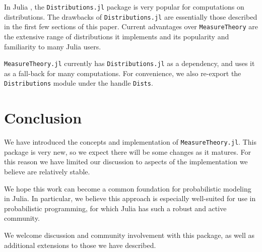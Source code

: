 \documentclass{juliacon}
\begin{document}



In Julia \cite{bezanson2017julia}, the \verb|Distributions.jl| package \cite{Distributions.jl-2019} is very popular for computations on distributions. The drawbacks of \verb|Distributions.jl| are essentially those described in the first few sections of this paper. 
Current advantages over \verb|MeasureTheory| are the extensive range of distributions it implements and its popularity and familiarity to many Julia users. 

\verb|MeasureTheory.jl| currently has \verb|Distributions.jl| as a dependency, and uses it as a fall-back for many computations. For convenience, we also re-export the \verb|Distributions| module under the handle \verb|Dists|.

\section{Conclusion}

We have introduced the concepts and implementation of \verb|MeasureTheory.jl|. This package is very new, so we expect there will be some changes as it matures. For this reason we have limited our discussion to aspects of the implementation we believe are relatively stable.

We hope this work can become a common foundation for probabilistic modeling in Julia. In particular, we believe this approach is especially well-suited for use in probabilistic programming, for which Julia has such a robust and active community.

We welcome discussion and community involvement with this package, as well as additional extensions to those we have described.


\end{document}
